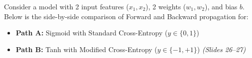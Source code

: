 \documentclass[10pt,a4paper]{article}
\begin{document}
\par\vspace{2pt}
Consider a model with 2 input features ($x_1, x_2$), 2 weights ($w_1, w_2$), and bias $b$. Below is the side-by-side comparison of Forward and Backward propagation for:
\begin{itemize}[leftmargin=12pt, itemsep=1pt]
    \item \textbf{Path A:} Sigmoid with Standard Cross-Entropy ($y \in \{0, 1\}$)
    \item \textbf{Path B:} Tanh with Modified Cross-Entropy ($y \in \{-1, +1\}$) \textit{(Slides 26--27)}
\end{itemize}

\vspace{1pt}
\end{document}

